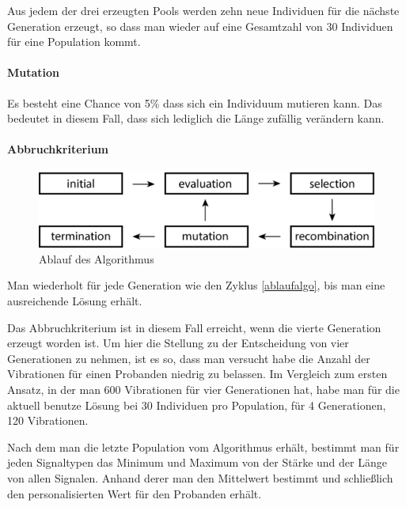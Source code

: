 Aus jedem der drei erzeugten Pools werden zehn neue Individuen f{\"u}r die n{\"a}chste Generation erzeugt, so dass man wieder auf eine Gesamtzahl von 30 Individuen f{\"u}r eine Population kommt.


\paragraph{Mutation}
Es besteht eine Chance von 5\% dass sich ein Individuum mutieren kann. Das bedeutet in diesem Fall, dass sich lediglich die L{\"a}nge zuf{\"a}llig ver{\"a}ndern kann. 

\paragraph{Abbruchkriterium}
\begin{figure}
	\centering
    \includegraphics[width=\textwidth]{pics/algo.png}
    \caption{Ablauf des Algorithmus}
    \label{fig:ablaufalgo}
\end{figure}

Man wiederholt f{\"u}r jede Generation wie den Zyklus \autoref{ablaufalgo}, bis man eine ausreichende L{\"o}sung erh{\"a}lt.

Das Abbruchkriterium ist in diesem Fall erreicht, wenn die vierte Generation erzeugt worden ist. Um hier die Stellung zu der Entscheidung von vier Generationen zu nehmen, ist es so, dass man versucht habe die Anzahl der Vibrationen f{\"u}r einen Probanden niedrig zu belassen. Im Vergleich zum ersten Ansatz, in der man 600 Vibrationen f{\"u}r vier Generationen hat, habe man f{\"u}r die aktuell benutze L{\"o}sung bei 30 Individuen pro Population, f{\"u}r 4 Generationen, 120 Vibrationen. 

Nach dem man die letzte Population vom Algorithmus erh{\"a}lt, bestimmt man f{\"u}r jeden Signaltypen das Minimum und Maximum von der St{\"a}rke und der L{\"a}nge von allen Signalen. Anhand derer man den Mittelwert bestimmt und schlie{\ss}lich den personalisierten Wert f{\"u}r den Probanden erh{\"a}lt.

